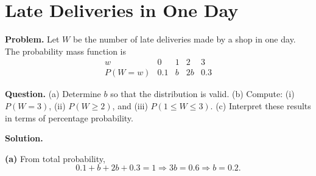 		\section{Late Deliveries in One Day}
		
		\textbf{Problem.}
		Let $W$ be the number of late deliveries made by a shop in one day. The probability mass function is
		\[
		\begin{array}{c|cccc}
			w & 0 & 1 & 2 & 3\\
			\hline
			P(W=w) & 0.1 & b & 2b & 0.3
		\end{array}
		\]
		
		\textbf{Question.}
		(a) Determine $b$ so that the distribution is valid.
		(b) Compute: (i) $P(W=3)$, (ii) $P(W\ge 2)$, and (iii) $P(1\le W\le 3)$.
		(c) Interpret these results in terms of percentage probability.
		
		\textbf{Solution.}

		\textbf{(a)} From total probability,
		\[
		0.1+b+2b+0.3=1\Rightarrow 3b=0.6\Rightarrow b=0.2.
		\]

